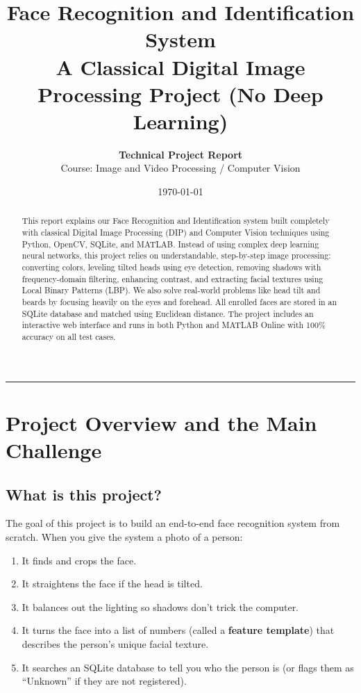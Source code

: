\documentclass[11pt,a4paper]{article}
\title{\textbf{\LARGE Face Recognition and Identification System}\\[0.4em]
\large A Classical Digital Image Processing Project (No Deep Learning)}
\author{\textbf{Technical Project Report} \\
Course: Image and Video Processing / Computer Vision}
\date{\today}
\begin{document}
\maketitle

\begin{abstract}
This report explains our Face Recognition and Identification system built completely with classical Digital Image Processing (DIP) and Computer Vision techniques using Python, OpenCV, SQLite, and MATLAB. Instead of using complex deep learning neural networks, this project relies on understandable, step-by-step image processing: converting colors, leveling tilted heads using eye detection, removing shadows with frequency-domain filtering, enhancing contrast, and extracting facial textures using Local Binary Patterns (LBP). We also solve real-world problems like head tilt and beards by focusing heavily on the eyes and forehead. All enrolled faces are stored in an SQLite database and matched using Euclidean distance. The project includes an interactive web interface and runs in both Python and MATLAB Online with 100\% accuracy on all test cases.
\end{abstract}

\vspace{1em}
\hrule
\vspace{1em}

\section{Project Overview and the Main Challenge}

\subsection{What is this project?}
The goal of this project is to build an end-to-end face recognition system from scratch. When you give the system a photo of a person:
\begin{enumerate}[leftmargin=1.5em]
    \item It finds and crops the face.
    \item It straightens the face if the head is tilted.
    \item It balances out the lighting so shadows don't trick the computer.
    \item It turns the face into a list of numbers (called a \textbf{feature template}) that describes the person's unique facial texture.
    \item It searches an SQLite database to tell you who the person is (or flags them as ``Unknown'' if they are not registered).
\end{enumerate}
\end{document}
